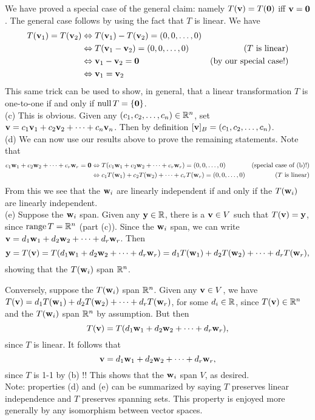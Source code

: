 \begin{solution}
We have proved a special case of the general claim: namely $T({\mathbf v})=T({\mathbf 0})$ iff ${\mathbf v}={\mathbf 0}$. The general case follows by using the fact that $T$ is linear. We have 
\begin{align*}
T({\mathbf v}_1)=T({\mathbf v}_2)&\Leftrightarrow T({\mathbf v}_1)-T({\mathbf v}_2)=(0,0,\dots, 0)\\
&\Leftrightarrow T({\mathbf v}_1-{\mathbf v}_2)=(0,0,\dots, 0) &\text{($T$ is linear)}\\
&\Leftrightarrow {\mathbf v}_1-{\mathbf v}_2={\mathbf 0} &\text{(by our special case!)}\\
&\Leftrightarrow {\mathbf v}_1={\mathbf v}_2
\end{align*}
This same trick can be used to show, in general, that a linear transformation $T$ is one-to-one if and only if $\operatorname{null} T=\{{\mathbf 0}\}$.
\\
(c) This is obvious. Given any $(c_1,c_2,\dots, c_n)\in{\mathbb R}^n$, set ${\mathbf v}=c_1{\mathbf v}_1+c_2{\mathbf v}_2+\cdots +c_n{\mathbf v}_n$. Then by definition $[{\mathbf v}]_B=(c_1,c_2,\dots, c_n)$. 
\\
(d) We can now use our results above to prove the remaining statements. Note that 
\begin{align*}
c_1{\mathbf w}_1+c_2{\mathbf w}_2+\cdots +c_r{\mathbf w}_r={\mathbf 0} &\Leftrightarrow T(c_1{\mathbf w}_1+c_2{\mathbf w}_2+\cdots +c_r{\mathbf w}_r)=(0,0,\dots, 0) &\text{(special case of (b)!)}\\
&\Leftrightarrow c_1T({\mathbf w}_1)+c_2T({\mathbf w}_2)+\cdots +c_rT({\mathbf w}_r)=(0,0,\dots, 0) &\text{($T$ is linear)}
\end{align*}
From this we see that the ${\mathbf w}_i$ are linearly independent if and only if the $T({\mathbf w}_i)$ are linearly independent. 
\\
(e) Suppose the ${\mathbf w}_i$ span. Given any ${\mathbf y}\in {\mathbb R}$, there is a ${\mathbf v}\in V$ such that $T({\mathbf v})={\mathbf y}$, since $\operatorname{range} T={\mathbb R}^n$ (part (c)). Since the ${\mathbf w}_i$ span, we can write ${\mathbf v}=d_1{\mathbf w}_1+d_2{\mathbf w}_2+\cdots +d_r{\mathbf w}_r$. Then 
\[
{\mathbf y}=T({\mathbf v})=T(d_1{\mathbf w}_1+d_2{\mathbf w}_2+\cdots +d_r{\mathbf w}_r)=d_1T({\mathbf w}_1)+d_2T({\mathbf w}_2)+\cdots +d_rT({\mathbf w}_r),\]
showing that the $T({\mathbf w}_i)$ span ${\mathbb R}^n$. 

Conversely, suppose the $T({\mathbf w}_i)$ span ${\mathbb R}^n$. Given any ${\mathbf v}\in V$, we have $T({\mathbf v})=d_1T({\mathbf w}_1)+d_2T({\mathbf w}_2)+\cdots +d_rT({\mathbf w}_r)$, for some $d_i\in{\mathbb R}$, since $T({\mathbf v})\in{\mathbb R}^n$ and the $T({\mathbf w}_i)$ span ${\mathbb R}^n$ by assumption. But then 
\[
T({\mathbf v})=T(d_1{\mathbf w}_1+d_2{\mathbf w}_2+\cdots +d_r{\mathbf w}_r),
\]
since $T$ is linear. It follows that 
\[
{\mathbf v}=d_1{\mathbf w}_1+d_2{\mathbf w}_2+\cdots +d_r{\mathbf w}_r,
\]
since $T$ is 1-1 by (b) !! This shows that the ${\mathbf w}_i$ span $V$, as desired. 
\\
Note: properties (d) and (e) can be summarized by saying $T$ preserves linear independence and $T$ preserves spanning sets. This property is enjoyed more generally by any isomorphism between vector spaces. 

\end{solution}
